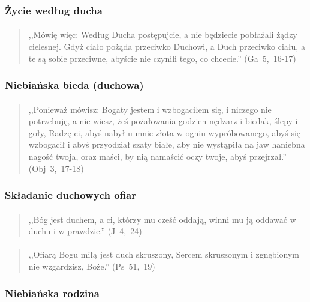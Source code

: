 \documentclass[10pt,a4paper,oneside]{article}
\begin{document}
\subsubsection{Życie według ducha}
\paragraph{}
\begin{quote}
,,Mówię więc: Według Ducha postępujcie, a nie będziecie pobłażali żądzy cielesnej. Gdyż ciało pożąda przeciwko Duchowi, a Duch przeciwko ciału, a te są sobie przeciwne, abyście nie czynili tego, co chcecie.'' \mbox{(Ga 5, 16-17)}
\end{quote}
\subsubsection{Niebiańska bieda (duchowa)}
\paragraph{}
\begin{quote}
,,Ponieważ mówisz: Bogaty jestem i wzbogaciłem się, i niczego nie potrzebuję, a nie wiesz, żeś pożałowania godzien nędzarz i biedak, ślepy i goły, Radzę ci, abyś nabył u mnie złota w ogniu wypróbowanego, abyś się wzbogacił i abyś przyodział szaty białe, aby nie wystąpiła na jaw haniebna nagość twoja, oraz maści, by nią namaścić oczy twoje, abyś przejrzał.'' \mbox{(Obj 3, 17-18)}
\end{quote}
\subsubsection{Składanie duchowych ofiar}
\paragraph{}
\begin{quote}
,,Bóg jest duchem, a ci, którzy mu cześć oddają, winni mu ją oddawać w duchu i w prawdzie.'' \mbox{(J 4, 24)}
\end{quote}
\paragraph{}
\begin{quote}
,,Ofiarą Bogu miłą jest duch skruszony, Sercem skruszonym i zgnębionym nie wzgardzisz, Boże.'' \mbox{(Ps 51, 19)}
\end{quote}
\subsubsection{Niebiańska rodzina}
\end{document}
